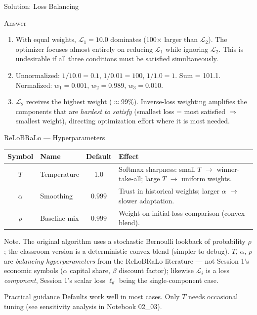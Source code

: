 \documentclass[aspectratio=169,11pt]{beamer}
\newcommand{\emphc}[1]{\textcolor{harvardcrimson}{#1}}
\begin{document}
\begin{frame}{Solution: Loss Balancing}
\begin{block}{Answer}
\begin{enumerate}
    \item With equal weights, $\mathcal{L}_1 = 10.0$ dominates (100$\times$ larger than $\mathcal{L}_2$). The optimizer focuses almost entirely on reducing $\mathcal{L}_1$ while ignoring $\mathcal{L}_2$. This is undesirable if all three conditions must be satisfied simultaneously.
    \item Unnormalized: $1/10.0 = 0.1$, $1/0.01 = 100$, $1/1.0 = 1$. Sum = 101.1.\\
    Normalized: $w_1 = 0.001$, $w_2 = 0.989$, $w_3 = 0.010$.
    \item $\mathcal{L}_2$ receives the highest weight ($\approx 99\%$). Inverse-loss weighting amplifies the components that are \emph{hardest to satisfy} (smallest loss = most satisfied $\Rightarrow$ smallest weight), directing optimization effort where it is most needed.
\end{enumerate}
\end{block}
\end{frame}

\begin{frame}[shrink=4]{ReLoBRaLo --- Hyperparameters}
\small
\begin{center}
\footnotesize
\renewcommand{\arraystretch}{1.2}
\begin{tabular}{@{}c l c p{6.2cm}@{}}
\toprule
\textbf{Symbol} & \textbf{Name} & \textbf{Default} & \textbf{Effect} \\
\midrule
$T$      & Temperature   & $1.0$   & Softmax sharpness: small $T$ $\to$ winner-take-all; large $T$ $\to$ uniform weights. \\
$\alpha$ & Smoothing     & $0.999$ & Trust in historical weights; larger $\alpha$ $\to$ slower adaptation. \\
$\rho$   & Baseline mix  & $0.999$ & Weight on initial-loss comparison (convex blend). \\
\bottomrule
\end{tabular}
\end{center}

\vspace{0.2cm}
{\scriptsize \emphc{Note.} The original algorithm uses a stochastic Bernoulli lookback of probability $\rho$; the classroom version is a deterministic convex blend (simpler to debug).  $T$, $\alpha$, $\rho$ are \emph{balancing hyperparameters} from the ReLoBRaLo literature --- not Session 1's economic symbols ($\alpha$ capital share, $\beta$ discount factor); likewise $\mathcal{L}_i$ is a loss \emph{component}, Session 1's scalar loss $\ell_\theta$ being the single-component case.}

\vspace{0.15cm}
\begin{block}{Practical guidance}
Defaults work well in most cases. Only $T$ needs occasional tuning (see sensitivity analysis in Notebook 02\_03).
\end{block}
\end{frame}
\end{document}
